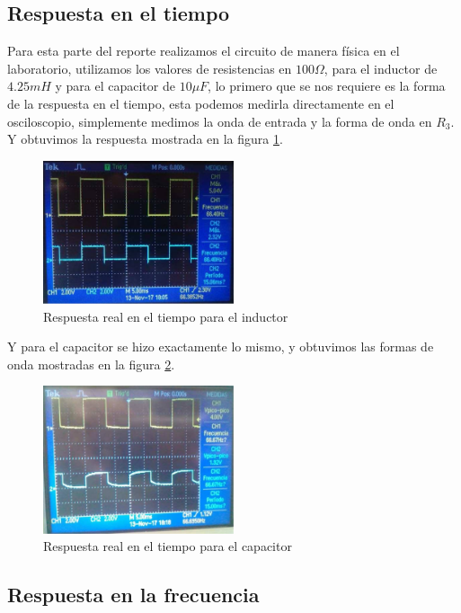 \documentclass[letterpaper,spanish,12pt]{report}
\begin{document}
	\subsection{Respuesta en el tiempo}

Para esta parte del reporte realizamos el circuito de manera f\'isica en el laboratorio, utilizamos los valores de resistencias en $100\Omega$, para el inductor de $4.25mH$ y para el capacitor de $10\mu F$, lo primero que se nos requiere es la forma de la respuesta en el tiempo, esta podemos medirla directamente en el osciloscopio, simplemente medimos la onda de entrada y la forma de onda en $R_{3}$. \\ \medskip Y obtuvimos la respuesta mostrada en la figura \ref{cir:12}.

\begin{figure}[h]
	\centering
		\includegraphics[width=0.50\textwidth]{ResReaTieL.eps}
	\caption{Respuesta real en el tiempo para el inductor}
	\label{cir:12}
\end{figure}

Y para el capacitor se hizo exactamente lo mismo, y obtuvimos las formas de onda mostradas en la figura \ref{cir:13}.

\begin{figure}[h]
	\centering
		\includegraphics[width=0.50\textwidth]{ResReaTieC.eps}
	\caption{Respuesta real en el tiempo para el capacitor}
	\label{cir:13}
\end{figure}

	\subsection{Respuesta en la frecuencia}
\end{document}
